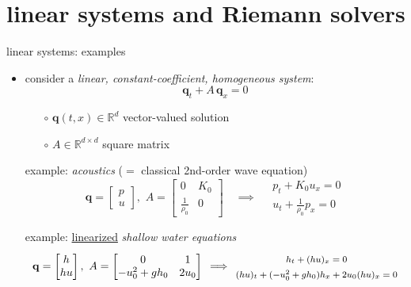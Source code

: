 \documentclass[10pt,dvipsnames,usepdftitle=false,
hyperref={pdftitle = {Finite volume methods},
    pdfauthor = {Ed Bueler}}]{beamer}
\newcommand{\bq}{\mathbf{q}}
\newcommand{\RR}{\mathbb{R}}
\begin{document}
\section{linear systems and Riemann solvers}

\begin{frame}{linear systems: examples}

\begin{itemize}
\item consider a \emph{linear, constant-coefficient, homogeneous system}:
  $$\bq_t + A\, \bq_x=0$$

    \begin{itemize}
    \item[$\circ$] $\bq(t,x) \in \RR^d$ vector-valued solution
    \item[$\circ$] $A\in\RR^{d\times d}$ square matrix
    \end{itemize}
 
\bigskip
\setlength{\itemindent}{11mm}
\item[example:] \emph{acoustics} ($=$ classical 2nd-order wave equation)
        $$\bq = \begin{bmatrix} p \\ u \end{bmatrix}, \,\, A = \begin{bmatrix} 0 & K_0 \\ \frac{1}{\rho_0} & 0 \end{bmatrix} \quad \implies \quad \begin{matrix} p_t + K_0 u_x = 0 \\ u_t + \frac{1}{\rho_0} p_x = 0 \end{matrix}$$
\item[example:] \underline{linearized} \emph{shallow water equations}
        $$\bq = \begin{bmatrix} h \\ h u \end{bmatrix}, \,\, A = \begin{bmatrix} 0 & 1 \\ -u_0^2+gh_0 & 2 u_0 \end{bmatrix} \, \implies \, {\footnotesize \begin{matrix} {\large \strut} h_t + (hu)_x = 0 \\ {\large \strut} (h u)_t + (-u_0^2+gh_0) h_x + 2u_0 (h u)_x = 0 \end{matrix} }$$
\end{itemize}
\end{frame}
\end{document}
